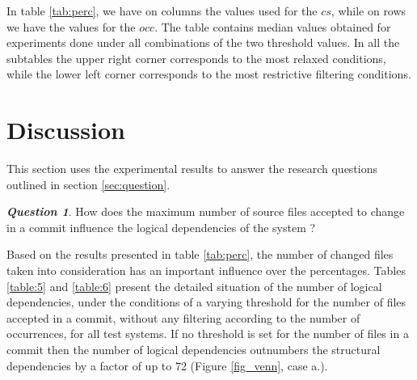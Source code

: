 \documentclass[conference]{IEEEtran}
\begin{document}
In table \ref{tab:perc},  we have on columns the values used for the $cs$, while on rows we have the values for the $occ$. The table contains median values obtained for experiments done under all combinations of the two threshold values. In all the subtables the upper right corner corresponds to the most relaxed conditions, while the lower left corner corresponds to the most restrictive filtering conditions.


\section{Discussion}
\label{sec:discussion}




This section uses the experimental results to answer the research questions outlined in section \ref{sec:question}.

\textit{\textbf{Question 1}}. How does the maximum number of source files accepted to change in a commit influence the logical dependencies of the system ?

Based on the results presented in table \ref{tab:perc}, the number of changed files taken into consideration has an important influence over the percentages. Tables \ref{table:5} and \ref{table:6}  present the detailed situation of the number of logical dependencies, under the conditions of a varying threshold for the number of files accepted in a commit, without any filtering according to the number of occurrences, for all test systems. If no threshold is set for the number of files in a commit then the number of logical dependencies outnumbers the structural dependencies by a factor of up to 72 (Figure \ref{fig_venn}, case a.). 
\end{document}
